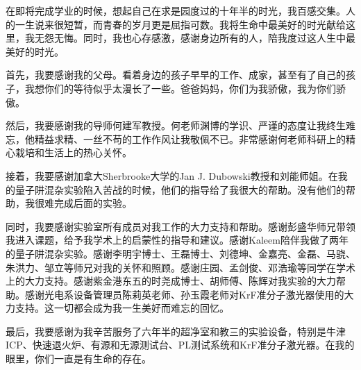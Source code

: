\documentclass{ZJUthesis}
\begin{document}
\begin{thanks}

在即将完成学业的时候，想起自己在求是园度过的十年半的时光，我百感交集。人的一生说来很短暂，而青春的岁月更是屈指可数。我将生命中最美好的时光献给这里，我无怨无悔。同时，我也心存感激，感谢身边所有的人，陪我度过这人生中最美好的时光。

首先，我要感谢我的父母。看着身边的孩子早早的工作、成家，甚至有了自己的孩子，我想你们的等待似乎太漫长了一些。爸爸妈妈，你们为我骄傲，我为你们骄傲。

然后，我要感谢我的导师何建军教授。何老师渊博的学识、严谨的态度让我终生难忘，他精益求精、一丝不苟的工作作风让我敬佩不已。非常感谢何老师科研上的精心栽培和生活上的热心关怀。

接着，我要感谢加拿大Sherbrooke大学的Jan J. Dubowski教授和刘能师姐。在我的量子阱混杂实验陷入苦战的时候，他们的指导给了我很大的帮助。没有他们的帮助，我很难完成后面的实验。

同时，我要感谢实验室所有成员对我工作的大力支持和帮助。感谢彭盛华师兄带领我进入课题，给予我学术上的启蒙性的指导和建议。感谢Kaleem陪伴我做了两年的量子阱混杂实验。感谢李明宇博士、王磊博士、刘德坤、金嘉亮、金磊、马骁、朱洪力、邹立等师兄对我的关怀和照顾。感谢庄园、孟剑俊、邓浩瑜等同学在学术上的大力支持。感谢紫金港东五的时尧成博士、胡师傅、陈辉对我实验的大力帮助。感谢光电系设备管理员陈莉英老师、孙玉霞老师对KrF准分子激光器使用的大力支持。这一切都会成为我一生美好而难忘的回忆。

最后，我要感谢为我辛苦服务了六年半的超净室和教三的实验设备，特别是牛津ICP、快速退火炉、有源和无源测试台、PL测试系统和KrF准分子激光器。在我的眼里，你们一直是有生命的存在。

\end{thanks}
\begin{abstract}

电信业进入二十一世纪之后，对网络带宽的需求还在持续增加。波分复用技术（WDM）、大范围可调谐激光器和单片集成技术的出现，极大地增加了每个光纤内传送的数据量，同时降低了光通信器件的制作成本。在过去的几十年中，量子阱混杂技术（QWI）被证明为一种简单有效的实现单片集成的方法。而其中的KrF准分子激光器量子阱混杂技术由于效果好、稳定性好，逐渐成为了最有希望的方法之一。

在本文中，利用实验室现有的KrF准分子激光器开发了基于紫外激光照射的量子阱混杂技术。首次应用这项技术成功制作了FP激光器和无源波导。测试得到的FP激光器和无源波导的性能甚至比量子阱混杂之前的性能更好。随后，我们将该技术应用到V型腔激光器中，首次实现了基于载流子注入的波长调谐功能。其中腔长差5\%的器件可以实现1550 nm波段100 GHz间隔的32个通道的单电极调谐，同时边模抑制比（SMSR）可以达到35 dB，与热调谐的V型腔激光器可以媲美。此外，调谐电流仅0\~40 mA，比热调谐的电流（>100 mA）小得多。最后，我们分析了该激光器的波长切换性能。相邻通道的切换时间仅1 ns左右，比热调谐的时间快了4个数量级。我们还研究了间隔通道数对切换时间的影响，发现随着间隔通道数增加，波长切换时间也随之增加，最后在10 ns左右趋于饱和。这种单电极控制的快速波长可切换半导体激光器在未来的波长路由光网络中有广阔的应用前景。

\end{abstract}
\end{document}
